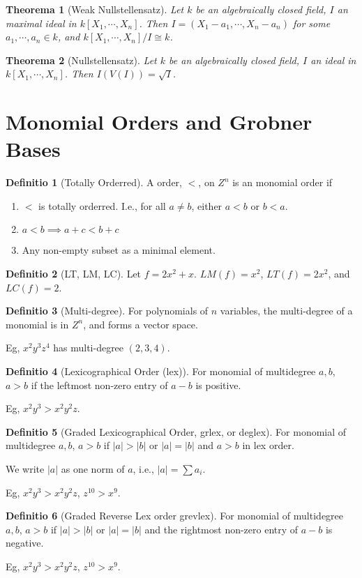 \documentclass[12pt, a4paper]{article}
\newtheorem{theorem}{Theorema}
\theoremstyle{definition}
\newtheorem{definition}{Definitio}
\theoremstyle{remark}
\begin{document}
\begin{theorem}[Weak Nullstellensatz]
	Let $k$ be an algebraically closed field, $I$ an maximal ideal in $k[X_1, \cdots, X_n]$.
	Then $I = (X_1 - a_1, \cdots, X_n - a_n)$ for some $a_1, \cdots, a_n \in k$, and $k[X_1, \cdots, X_n]/I \cong k$.
\end{theorem}

\begin{theorem}[Nullstellensatz]
	Let $k$ be an algebraically closed field, $I$ an ideal in $k[X_1, \cdots, X_n]$.
	Then $I(V(I)) = \sqrt{I}$.
\end{theorem}

\section{Monomial Orders and Grobner Bases}
\begin{definition}[Totally Orderred]
	A order, $<$, on $Z^n$ is an monomial order if 
	\begin{enumerate} 
		\item $<$ is totally orderred. I.e., for all $a \neq b$, either $a<b$ or $b<a$.
		\item $a<b \implies a + c < b + c$
		\item Any non-empty subset as a minimal element.
	\end{enumerate}
\end{definition}

\begin{definition}[LT, LM, LC]
	Let $f = 2x^2 + x$. $LM(f) = x^2$, $LT(f) = 2x^2$, and $LC(f) = 2$.
\end{definition}

\begin{definition}[Multi-degree]
	For polynomials of $n$ variables, the multi-degree of a monomial is in $Z^n$, and forms a vector space.

	Eg, $x^2y^3z^4$ has multi-degree $(2,3,4)$.
\end{definition}

\begin{definition}[Lexicographical Order (lex)]
	For monomial of multidegree $a,b$, $a>b$ if the leftmost non-zero entry of $a-b$ is positive.

	Eg, $x^2y^3 > x^2y^2z$.
\end{definition}

\begin{definition}[Graded Lexicographical Order, grlex, or deglex]

	For monomial of multidegree $a,b$, $a>b$ if $|a| > |b|$ or $|a| = |b|$ and $a > b$ in lex order.

	We write $|a|$ as one norm of $a$, i.e., $|a| = \sum a_i$.

	Eg, $x^2y^3 > x^2y^2z$, $z^10 > x^9$.
\end{definition}

\begin{definition}[Graded Reverse Lex order grevlex]
	For monomial of multidegree $a,b$, $a>b$ if $|a| > |b|$ or $|a| = |b|$ and the rightmost non-zero entry of $a-b$ is negative.

	Eg, $x^2y^3 > x^2y^2z$, $z^10 > x^9$.
\end{definition}



\end{document}
